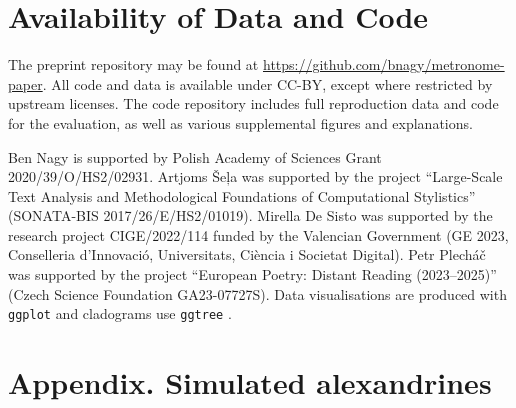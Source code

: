 \documentclass[
    hf
]{ceurart}
\begin{document}
\section{Availability of Data and Code}\label{sec:data}

The preprint repository may be found at \url{https://github.com/bnagy/metronome-paper}. All code
and data is available under CC-BY, except where restricted by upstream licenses.
The code repository includes full reproduction data and code for the evaluation,
as well as various supplemental figures and explanations.

\FloatBarrier

\begin{acknowledgments}
    Ben Nagy is supported by Polish Academy of Sciences Grant 2020/39/O/HS2/02931. Artjoms Šeļa was supported by the
    project “Large-Scale Text Analysis and Methodological Foundations of Computational Stylistics” (SONATA-BIS
    2017/26/E/HS2/01019). Mirella De Sisto was supported by the research project CIGE/2022/114 funded by the Valencian
    Government (GE 2023, Conselleria d’Innovació, Universitats, Ciència i Societat Digital). Petr Plecháč was supported
    by the project “European Poetry: Distant Reading (2023--2025)” (Czech Science Foundation GA23-07727S). Data
    visualisations are produced with \texttt{ggplot} \cite{ggplot} and cladograms use \texttt{ggtree} \cite{ggtree}.
\end{acknowledgments}

\printbibliography
\FloatBarrier

\appendix
\section*{Appendix. Simulated alexandrines}\label{sec:appendix}
\end{document}
